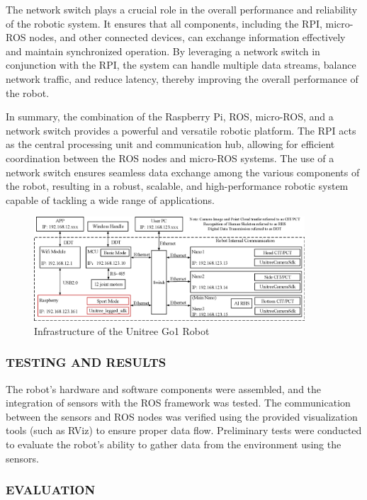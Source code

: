 \documentclass[12pt]{article}
\begin{document}
    The network switch plays a crucial role in the overall performance and reliability of the robotic system. It ensures that all components, including the RPI, micro-ROS nodes, and other connected devices, can exchange information effectively and maintain synchronized operation. By leveraging a network switch in conjunction with the RPI, the system can handle multiple data streams, balance network traffic, and reduce latency, thereby improving the overall performance of the robot.

    In summary, the combination of the Raspberry Pi, ROS, micro-ROS, and a network switch provides a powerful and versatile robotic platform. The RPI acts as the central processing unit and communication hub, allowing for efficient coordination between the ROS nodes and micro-ROS systems. The use of a network switch ensures seamless data exchange among the various components of the robot, resulting in a robust, scalable, and high-performance robotic system capable of tackling a wide range of applications.

    \begin{figure}[H]
        \centering
        \includegraphics[width=0.9\textwidth]{Go1CommFram_E.png}    
        \caption{Infrastructure of the Unitree Go1 Robot}
    \end{figure}

        \subsubsection{TESTING AND RESULTS}

        The robot's hardware and software components were assembled, and the integration of sensors with the ROS framework was tested. The communication between the sensors and ROS nodes was verified using the provided visualization tools (such as RViz) to ensure proper data flow. Preliminary tests were conducted to evaluate the robot's ability to gather data from the environment using the sensors.

        \subsubsection{EVALUATION}
\end{document}

